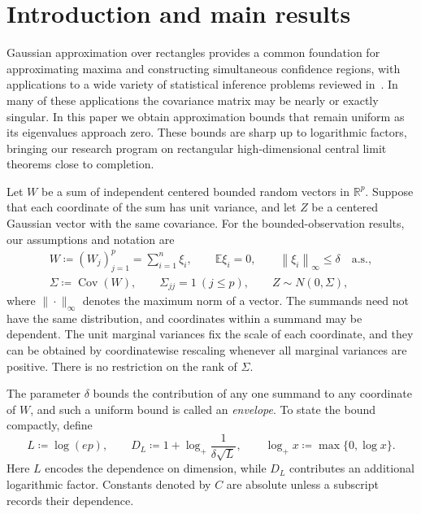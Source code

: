\documentclass[11pt,letterpaper]{article}
\theoremstyle{remark}
\newcommand{\E}{\mathbb E}
\newcommand{\R}{\mathbb R}
\newcommand{\Cov}{\operatorname{Cov}}
\newcommand{\norm}[1]{\left\lVert#1\right\rVert}
\begin{document}
\section{\texorpdfstring{Introduction and main results}{Introduction and main results}}\label{sec:results}
Gaussian approximation over rectangles provides a common foundation for
approximating maxima and constructing simultaneous confidence regions, with
applications to a wide variety of statistical inference problems reviewed in~\cite{CCKK2023}.
In many of these applications the {covariance} matrix may be nearly or
exactly singular. {In this paper we obtain} approximation bounds that remain uniform
as its eigenvalues approach zero. {These bounds are sharp up to
logarithmic factors, bringing our research program on rectangular
high-dimensional central limit theorems close to completion.}

Let \(W\) be a sum of independent centered bounded random vectors in
\(\R^p\). Suppose that each coordinate of the sum has unit variance,
and let \(Z\) be a centered Gaussian vector with the same covariance.
For the bounded-observation results, our assumptions and notation are
\begin{equation}
 \begin{gathered}
 W\coloneqq (W_j)_{j=1}^p=\sum_{i=1}^n\xi_i,\qquad
 \E\xi_i=0,\qquad \norm{\xi_i}_\infty\le\delta\quad\text{a.s.},\\
 \Sigma\coloneqq \Cov(W),\qquad\Sigma_{jj}=1\ (j\le p),
 \qquad Z\sim N(0,\Sigma),
 \end{gathered}
 \label{eq:setup}
\end{equation}
where $\|\cdot\|_\infty$ denotes the maximum norm of a vector. 
The summands need not have the same distribution, and coordinates within
a summand may be dependent. The unit marginal variances fix the scale
of each coordinate, and they can be obtained by coordinatewise rescaling
whenever all marginal variances are positive. There is no
restriction on the rank of \(\Sigma\).

The parameter \(\delta\) bounds the contribution of any one summand
to any coordinate of \(W\), and such a uniform bound is called an
\emph{envelope}. To state the
bound compactly, {define}
\[
 L\coloneqq \log(ep),\qquad
 D_L\coloneqq 1+\log_+\frac1{\delta\sqrt L},\qquad
 \log_+x\coloneqq \max\{0,\log x\}.
\]
Here \(L\) encodes the dependence on dimension, while \(D_L\)
contributes an additional logarithmic factor. Constants denoted by
\(C\) are absolute unless a subscript records their dependence.
\end{document}
